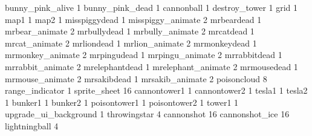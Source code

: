 bunny_pink_alive 1
bunny_pink_dead 1
cannonball 1
destroy_tower 1
grid 1
map1 1
map2 1
misspiggydead 1
misspiggy_animate 2
mrbeardead 1
mrbear_animate 2
mrbullydead 1
mrbully_animate 2
mrcatdead 1
mrcat_animate 2
mrliondead 1
mrlion_animate 2
mrmonkeydead 1
mrmonkey_animate 2
mrpingudead 1
mrpingu_animate 2
mrrabbitdead 1
mrrabbit_animate 2
mrelephantdead 1
mrelephant_animate 2
mrmousedead 1
mrmouse_animate 2
mrsakibdead 1
mrsakib_animate 2
poisoncloud 8
range_indicator 1
sprite_sheet 16
cannontower1 1
cannontower2 1
tesla1 1
tesla2 1
bunker1 1
bunker2 1
poisontower1 1
poisontower2 1
tower1 1
upgrade_ui_background 1
throwingstar 4
cannonshot 16
cannonshot_ice 16
lightningball 4
